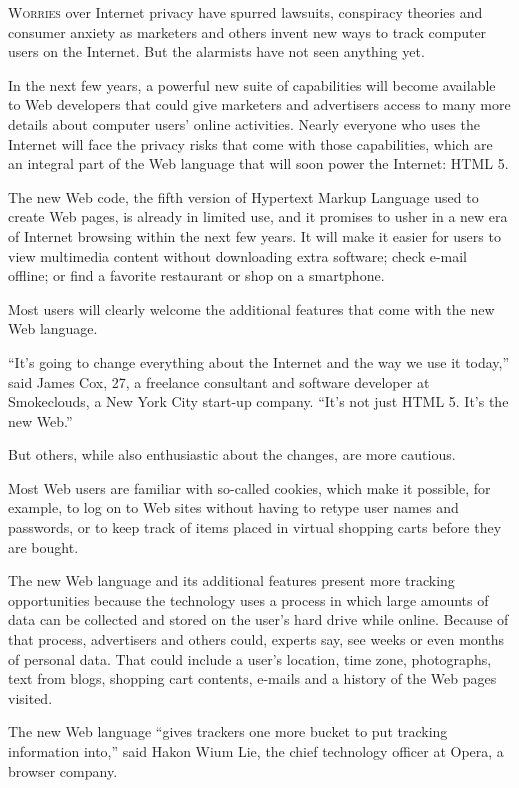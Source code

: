 ﻿\documentclass[12pt]{article}
\begin{document}
\lettrine{W}{orries} over Internet privacy have spurred lawsuits, conspiracy
theories and consumer anxiety as marketers and others invent new ways to track computer users on the
Internet. But the alarmists have not seen anything yet.

In the next few years, a powerful new suite of capabilities will become available to Web developers
that could give marketers and advertisers access to many more details about computer users' online
activities. Nearly everyone who uses the Internet will face the privacy risks that come with those
capabilities, which are an integral part of the Web language that will soon power the Internet: HTML
5.

The new Web code, the fifth version of Hypertext Markup Language used to create Web pages, is
already in limited use, and it promises to usher in a new era of Internet browsing within the next
few years. It will make it easier for users to view multimedia content without downloading extra
software; check e-mail offline; or find a favorite restaurant or shop on a smartphone.

Most users will clearly welcome the additional features that come with the new Web language.

``It's going to change everything about the Internet and the way we use it today,'' said James Cox,
27, a freelance consultant and software developer at Smokeclouds, a New York City start-up company.
``It's not just HTML 5. It's the new Web.''

But others, while also enthusiastic about the changes, are more cautious.

Most Web users are familiar with so-called cookies, which make it possible, for example, to log on
to Web sites without having to retype user names and passwords, or to keep track of items placed in
virtual shopping carts before they are bought.

The new Web language and its additional features present more tracking opportunities because the
technology uses a process in which large amounts of data can be collected and stored on the user's
hard drive while online. Because of that process, advertisers and others could, experts say, see
weeks or even months of personal data. That could include a user's location, time zone, photographs,
text from blogs, shopping cart contents, e-mails and a history of the Web pages visited.

The new Web language ``gives trackers one more bucket to put tracking information into,'' said Hakon
Wium Lie, the chief technology officer at Opera, a browser company.
\end{document}
